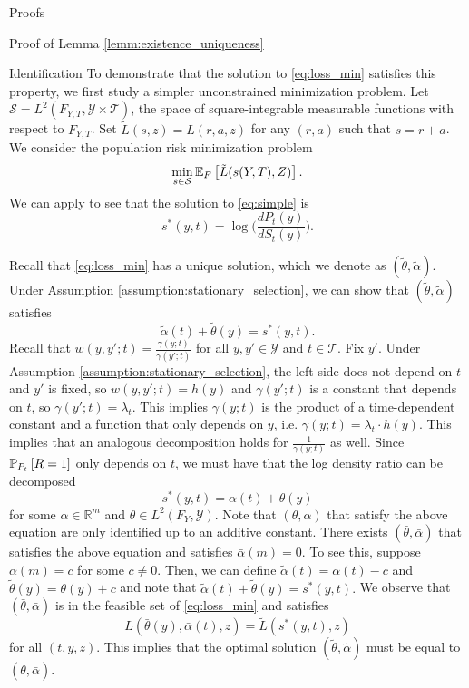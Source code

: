 \documentclass{article}
\theoremstyle{definition}
\theoremstyle{plain}
\theoremstyle{remark}
\begin{document}
\begin{section}{Proofs}
\begin{subsection}{Proof of Lemma \ref{lemm:existence_uniqueness}}
\begin{subsubsection}{Identification}
To demonstrate that the solution to \eqref{eq:loss_min} satisfies this property, we first study a simpler unconstrained minimization problem. Let $\mathcal{S} = L^{2}(F_{Y,T}, \mathcal{Y} \times \mathcal{T})$, the space of square-integrable measurable functions with respect to $F_{Y, T}$. Set $\tilde{L}(s, z) = L(r, a, z)$ for any $(r, a)$ such that $s = r+ a$. We consider the population risk minimization problem 
\begin{equation} \label{eq:simple} \min_{s \in \mathcal{S}} \EE[F]{\tilde{L}(s(Y, T), Z)}.\end{equation}
We can apply \citet{sugiyama2008direct} to see that the solution to \eqref{eq:simple} is 
\begin{equation} \label{eq:density_ratio} s^{*}(y, t) = \log\Big(\frac{dP_{t}(y)}{dS_{t}(y)} \Big). \end{equation}

Recall that \eqref{eq:loss_min} has a unique solution, which we denote as $(\tilde{\theta}, \tilde{\alpha})$. Under Assumption \ref{assumption:stationary_selection}, we can show that $(\tilde{\theta}, \tilde{\alpha})$ satisfies
\begin{equation} \label{eq:decomp} \tilde{\alpha}(t) +  \tilde{\theta}(y) = s^{*}(y, t). \end{equation}
Recall that $w(y, y'; t) = \frac{\gamma(y;t)}{\gamma(y'; t)}$ for all $y, y' \in \mathcal{Y}$ and $t \in \mathcal{T}$. Fix $y'$. Under Assumption \ref{assumption:stationary_selection}, the left side does not depend on $t$ and $y'$ is fixed, so $w(y, y'; t) = h(y)$ and $\gamma(y'; t)$ is a constant that depends on $t$, so $\gamma(y'; t) = \lambda_{t}.$ This implies $\gamma(y;t)$ is the product of a time-dependent constant and a function that only depends on $y$, i.e. $\gamma(y;t) = \lambda_{t} \cdot h(y)$. This implies that an analogous decomposition holds for $\frac{1}{\gamma(y; t)}$ as well. Since $\PP[P_{t}]{R=1}$ only depends on $t$, we must have that the log density ratio can be decomposed
\[ s^{*}(y, t) = \alpha(t) + \theta(y)\]
for some $\alpha \in \mathbb{R}^{m}$ and $\theta \in L^{2}(F_{Y}, \mathcal{Y}).$ Note that $(\theta, \alpha)$ that satisfy the above equation are only identified up to an additive constant. There exists $(\bar{\theta}, \bar{\alpha})$ that satisfies the above equation and satisfies $\bar{\alpha}(m) = 0.$ To see this, suppose $\alpha(m) = c$ for some $c \neq 0$. Then, we can define $\tilde{\alpha}(t) = \alpha(t) - c$ and $\tilde{\theta}(y) = \theta(y) + c$ and note that $\tilde{\alpha}(t) + \tilde{\theta}(y) = s^{*}(y, t).$ We observe that $(\bar{\theta}, \bar{\alpha})$ is in the feasible set of \eqref{eq:loss_min} and satisfies
\[ L(\bar{\theta}(y), \bar{\alpha}(t), z) = \tilde{L}(s^{*}(y, t), z) \]
for all $(t, y, z).$ This implies that the optimal solution $(\tilde{\theta}, \tilde{\alpha})$ must be equal to $(\bar{\theta}, \bar{\alpha}).$


\end{subsubsection}
\end{subsection}
\end{section}
\end{document}
